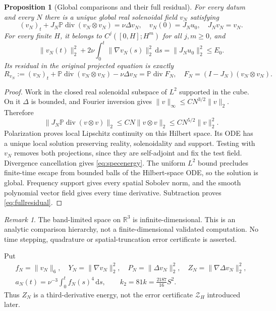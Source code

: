 \documentclass[11pt,a4paper]{article}
\newtheorem{proposition}[theorem]{Proposition}
\theoremstyle{definition}\newtheorem{definition}[theorem]{Definition}
\theoremstyle{remark}\newtheorem{remark}[theorem]{Remark}
\newcommand{\R}{\mathbb R}
\newcommand{\PP}{\mathbb P}
\newcommand{\dd}{\,\mathrm d}
\newcommand{\norm}[1]{\lVert #1\rVert}
\newcommand{\diver}{\operatorname{div}}
\newcommand{\Zcert}{\mathscr Z}
\numberwithin{equation}{section}
\begin{document}
\begin{proposition}[Global comparisons and their full residual]\label{prop:spectral}
For every datum and every $N$ there is a unique global real solenoidal field $v_N$ satisfying
\begin{equation}\label{eq:spectral}
 (v_N)_t+J_N\PP\diver(v_N\otimes v_N)=\nu\Delta v_N,
 \quad v_N(0)=J_Nu_0,\quad J_Nv_N=v_N.
\end{equation}
For every finite $H$, it belongs to $C^j([0,H];H^m)$ for all $j,m\ge0$, and
\begin{equation}\label{eq:specenergy}
 \norm{v_N(t)}_2^2+2\nu\int_0^t\norm{\nabla v_N(s)}_2^2\dd s
 =\norm{J_Nu_0}_2^2\le E_0.
\end{equation}
Its residual in the \emph{original} projected equation is exactly
\begin{equation}\label{eq:fullresidual}
 R_{v_N}:=(v_N)_t+\PP\diver(v_N\otimes v_N)-\nu\Delta v_N
 =\PP\diver F_N,\quad F_N=(I-J_N)(v_N\otimes v_N).
\end{equation}
\end{proposition}
\begin{proof}
Work in the closed real solenoidal subspace of $L^2$ supported in the cube. On it $\Delta$ is bounded, and Fourier inversion gives $\norm v_\infty\le CN^{3/2}\norm v_2$. Therefore
\[
 \norm{J_N\PP\diver(v\otimes v)}_2
 \le CN\norm{v\otimes v}_2\le CN^{5/2}\norm v_2^2.
\]
Polarization proves local Lipschitz continuity on this Hilbert space. Its ODE has a unique local solution preserving reality, solenoidality and support. Testing with $v_N$ removes both projections, since they are self-adjoint and fix the test field. Divergence cancellation gives \eqref{eq:specenergy}. The uniform $L^2$ bound precludes finite-time escape from bounded balls of the Hilbert-space ODE, so the solution is global. Frequency support gives every spatial Sobolev norm, and the smooth polynomial vector field gives every time derivative. Subtraction proves \eqref{eq:fullresidual}.
\end{proof}
\begin{remark}
The band-limited space on $\R^3$ is infinite-dimensional. This is an analytic comparison hierarchy, not a finite-dimensional validated computation. No time stepping, quadrature or spatial-truncation error certificate is asserted.
\end{remark}

Put
\begin{equation}\label{eq:spectralquantities}
 \begin{gathered}
 f_N=\norm{v_N}_6,\quad Y_N=\norm{\nabla v_N}_2^2,
 \quad P_N=\norm{\Delta v_N}_2^2,\quad Z_N=\norm{\nabla\Delta v_N}_2^2,\\
 a_N(t)=\nu^{-3}\int_0^t f_N(s)^4\dd s,\qquad
 k_2=81k=\frac{2187}{16}S^2.
 \end{gathered}
\end{equation}
Thus $Z_N$ is a third-derivative energy, not the error certificate $\Zcert_H$ introduced later.
\end{document}
